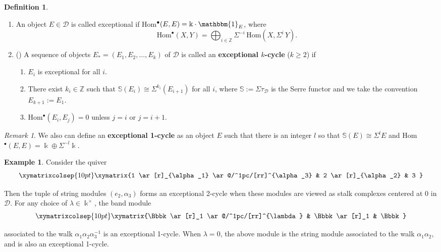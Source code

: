 \documentclass[12pt]{amsart}
\theoremstyle{plain}
\theoremstyle{definition}
\newtheorem{defn}{Definition}[section]
\newtheorem{exmp}{Example}
    [section]
\theoremstyle{remark}
\newtheorem{rem}{Remark}[section]
\begin{document}
\begin{defn}
\leavevmode
\begin{enumerate}
\item An object $E \in \mathscr{D}$ is called exceptional if Hom$^{\bullet}(E,E) = \Bbbk \cdot \mathbbm{1}_{E}$, where $$\text{Hom}^{\bullet}(X,Y) = \displaystyle\bigoplus_{i \in \mathbb{Z}} \Sigma^{-i}\,\text{Hom}(X,\Sigma^{i}\,Y).$$

\item (\cite{broomhead2017discrete}) A sequence of objects $E_* = (E_1, E_2, \dots, E_k)$ of $\mathscr{D}$ is called an \textbf{exceptional $k$-cycle} ($k \geq 2$) if 

\begin{enumerate}
\item $E_i$ is exceptional for all $i$.
\item There exist $k_i \in \mathbb{Z}$ such that $\mathbb{S}(E_i) \cong \Sigma^{k_i}(E_{i+1})$ for all $i$, where $\mathbb{S} := \Sigma \tau_{\mathscr{D}}$ is the Serre functor and we take the convention $E_{k+1} := E_1$.
\item Hom$^{\bullet}(E_i,E_j) = 0$ unless $j = i$ or $j = i+1$.
\end{enumerate}
\end{enumerate}
\end{defn}

\begin{rem}
    We also can define an \textbf{exceptional 1-cycle} as an object $E$ such that there is an integer $l$ so that $\mathbb{S}(E) \cong \Sigma^l E$ and Hom$^{\bullet}(E,E) = \Bbbk \oplus \Sigma^{-l}\Bbbk$.
\end{rem}

\begin{exmp}
Consider the quiver 
\[
\xymatrixcolsep{10pt}
\xymatrix{%
1 \ar[r]_{\alpha_1} \ar@/^1pc/[rr]^{\alpha_3} & 2 \ar[r]_{\alpha_2} & 3 }\]

Then the tuple of string modules $(e_2,\alpha_3)$ forms an exceptional 2-cycle when these modules are viewed as stalk complexes centered at $0$ in $\mathscr{D}$. For any choice of $\lambda \in \Bbbk^{\times}$, the band module \[
\xymatrixcolsep{10pt}
\xymatrix{%
\Bbbk \ar[r]_1 \ar@/^1pc/[rr]^{\lambda} & \Bbbk \ar[r]_1 & \Bbbk }\]

associated to the walk $\alpha_1\alpha_2\alpha_3^{-1}$ is an exceptional 1-cycle. When $\lambda = 0$, the above module is the string module associated to the walk $\alpha_1\alpha_2$, and is also an exceptional 1-cycle.
\end{exmp}
\end{document}
